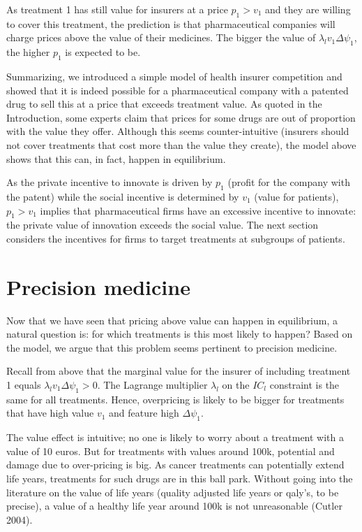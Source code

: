 \documentclass[a4paper,12pt]{article}
\makeatletter
\newcommand{\citeprocitem}[2]{\hyper@linkstart{cite}{citeproc_bib_item_#1}#2\hyper@linkend}
\makeatother
\begin{document}
As treatment 1 has still value for insurers at a price \(p_1 > v_1\) and they are willing to cover this treatment, the prediction is that pharmaceutical companies will charge prices above the value of their medicines. The bigger the value of \(\lambda_l v_1 \Delta \psi_1\), the higher \(p_1\) is expected to be.

Summarizing, we introduced a simple model of health insurer competition and showed that it is indeed possible for a pharmaceutical company with a patented drug to sell this at a price that exceeds treatment value. As quoted in the Introduction, some experts claim that prices for some drugs are out of proportion with the value they offer. Although this seems counter-intuitive (insurers should not cover treatments that cost more than the value they create), the model above shows that this can, in fact, happen in equilibrium.

As the private incentive to innovate is driven by \(p_1\) (profit for the company with the patent) while the social incentive is determined by \(v_1\) (value for patients), \(p_1>v_1\) implies that pharmaceutical firms have an excessive incentive to innovate: the private value of innovation exceeds the social value. The next section considers the incentives for firms to target treatments at subgroups of patients.



\section{Precision medicine}
\label{sec:org9d883d0}

Now that we have seen that pricing above value can happen in equilibrium, a natural question is: for which treatments is this most likely to happen? Based on the model, we argue that this problem seems pertinent to precision medicine.

Recall from above that the marginal value for the insurer of including treatment 1 equals \(\lambda_l v_1 \Delta \psi_1 >0\). The Lagrange multiplier \(\lambda_l\) on the \(IC_l\) constraint is the same for all treatments. Hence, overpricing is likely to be bigger for treatments that have high value \(v_1\) and feature high \(\Delta \psi_1\).

The value effect is intuitive; no one is likely to worry about a treatment with a value of 10 euros. But for treatments with values around 100k, potential and damage due to over-pricing is big. As cancer treatments can potentially extend life years, treatments for such drugs are in this ball park. Without going into the literature on the value of life years (quality adjusted life years or qaly's, to be precise), a value of a healthy life year around 100k is not unreasonable (\citeprocitem{9}{Cutler 2004}).
\end{document}
